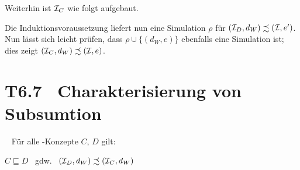 \documentclass[fontsize=11pt, twoside=false, numbers=autoenddot]{scrbook}
\begin{document}
\begin{description}
\begin{description}
\begin{description}
            Weiterhin ist $\mathcal{I}_C$ wie folgt aufgebaut.
            \begin{center}
            \end{center}
            \parI
            Die Induktionsvoraussetzung liefert nun eine Simulation
            $\rho$ für $(\mathcal{I}_D,d_W) \precsim (\mathcal{I},e')$.
            Nun lässt sich leicht prüfen, dass $\rho \cup \{(d_W,e)\}$
            ebenfalls eine Simulation ist;
            dies zeigt $(\mathcal{I}_C,d_W) \precsim (\mathcal{I},e)$.
            \qedhere
        \end{description}
    \end{description}
\end{description}

\pagebreak
\section*{T6.7~ Charakterisierung von Subsumtion}

~
Für alle \EL-Konzepte $C$, $D$ gilt:
\begin{center}
  $C \sqsubseteq D$ ~gdw.~ $(\mathcal{I}_D,d_W) \precsim (\mathcal{I}_C,d_W)$
\end{center}
\end{document}
